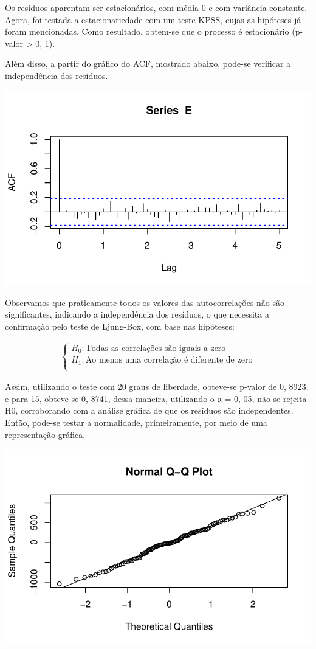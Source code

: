 \documentclass[
  letterpaper,
  DIV=11,
  numbers=noendperiod]{scrartcl}
\begin{document}
Os resíduos aparentam ser estacionários, com média 0 e com variância
constante. Agora, foi testada a estacionariedade com um teste KPSS,
cujas as hipóteses já foram mencionadas. Como resultado, obtem-se que o
processo é estacionário (p-valor \textgreater{} 0, 1).

Além disso, a partir do gráfico do ACF, mostrado abaixo, pode-se
verificar a independência dos resíduos.

\includegraphics{T2_grupo10_files/figure-pdf/unnamed-chunk-1-1.pdf}

Observamos que praticamente todos os valores das autocorrelações não são
significantes, indicando a independência dos resíduos, o que necessita a
confirmação pelo teste de Ljung-Box, com base nas hipóteses:

\begin{align}
  \begin{cases}
    H_0:\text{Todas as correlações são iguais a zero}\\
    H_1: \text{Ao menos uma correlação é diferente de zero}\\
  \end{cases}
\end{align}

Assim, utilizando o teste com 20 graus de liberdade, obteve-se p-valor
de 0, 8923, e para 15, obteve-se 0, 8741, dessa maneira, utilizando o α
= 0, 05, não se rejeita H0, corroborando com a análise gráfica de que os
resíduos são independentes. Então, pode-se testar a normalidade,
primeiramente, por meio de uma representação gráfica.

\includegraphics{T2_grupo10_files/figure-pdf/unnamed-chunk-2-1.pdf}
\end{document}
